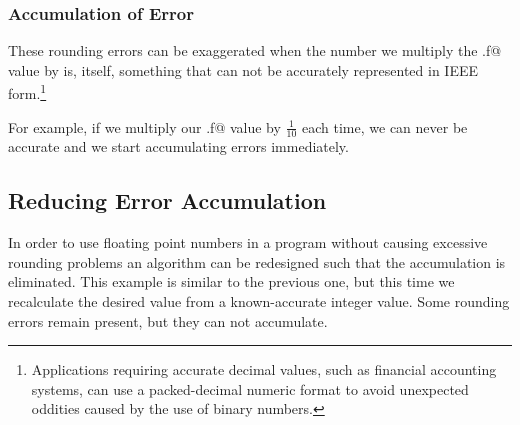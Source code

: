 
\subsubsection{Accumulation of Error}
These  rounding errors can be exaggerated when the number we multiply 
the \verb@x.f@ value by is, itself, something that can not be accurately 
represented in IEEE 
form.\footnote{Applications requiring accurate decimal values, such as 
financial accounting systems, can use a packed-decimal numeric format
to avoid unexpected oddities caused by the use of binary numbers.}

For example, if we multiply our \verb@x.f@ value by $\frac{1}{10}$ each time, 
we can never be accurate and we start accumulating errors immediately.


\subsection{Reducing Error Accumulation} 
In order to use floating point numbers in a program without causing 
excessive rounding problems an algorithm can be redesigned such that the 
accumulation is eliminated.  
This example is similar to the previous one, but this time we recalculate the 
desired value from a known-accurate integer value.  
Some rounding errors remain present, but they can not accumulate.

